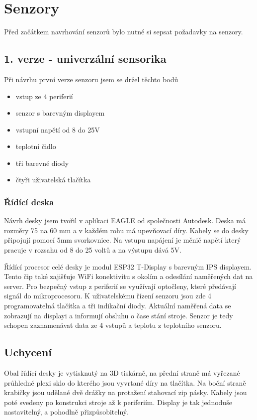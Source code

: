 \chapter{Senzory}

Před začátkem navrhování senzorů bylo nutné si sepsat požadavky na senzory.




\section{1. verze - univerzální sensorika}

Při návrhu první verze senzoru jsem se držel těchto bodů
\begin{itemize}
    \item vstup ze 4 periferií
    \item senzor s barevným displayem
    \item vstupní napětí od 8 do 25V
    \item teplotní čidlo
    \item tři barevné diody
    \item čtyři uživatelská tlačítka
\end{itemize}


\subsection{Řídící deska}
Návrh desky jsem tvořil v aplikaci EAGLE od společnosti Autodesk. 
Deska má rozměry 75 na 60 mm a v každém rohu má upevňovací díry. 
Kabely se do desky připojují pomocí 5mm svorkovnice.
Na vstupu napájení je měnič napětí který pracuje v rozsahu od 8 do 25 voltů a na výstupu dává 5V. 

Řídící procesor celé desky je modul ESP32 T-Display\cite{ESP32} s barevným IPS displayem.
Tento čip také zajišťuje WiFi konektivitu s okolím a odesílání naměřených dat na server.
Pro bezpečný vstup z periferií se využívají optočleny, které předávají signál do mikroprocesoru.
\fxnote[author=JA]{\textcolor{mygreen}{Optočlen}}
K uživatelskému řízení senzoru jsou zde 4 programovatelná tlačítka a tři indikační diody.
Aktuální naměřená data se zobrazují na displayi a informují obsluhu o čase stání stroje.
\fxnote[author=JA]{\textcolor{mygreen}{Čase stání stroje - napsat jinak}}
Senzor je tedy schopen zaznamenávat data ze 4 vstupů a teplotu z teplotního senzoru.

\section{Uchycení}
Obal řídící desky je vytisknutý na 3D tiskárně, na přední straně má vyřezané průhledné plexi sklo do kterého jsou vyvrtané díry na tlačítka.
\fxnote[author=JA]{\textcolor{mygreen}{Překopat :-)}}
Na boční straně krabičky jsou udělané dvě drážky na protažení stahovací zip pásky. Kabely jsou poté svedeny po konstrukci stroje až k periferiím.
Display je tak jednoduše nastavitelný, a pohodlně přizpůsobitelný.


